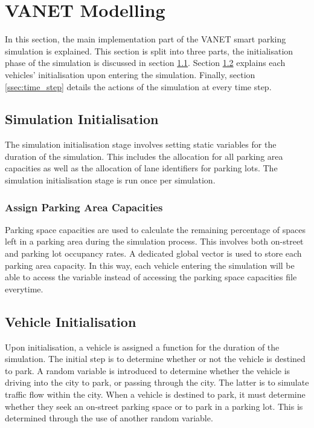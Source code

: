 \section{\ac{VANET} Modelling}
In this section, the main implementation part of the \ac{VANET} smart parking simulation is explained. This section is split into three parts, the initialisation phase of the simulation is discussed in section \ref{ssec:sim_init}. Section \ref{ssec:vehicle_init} explains each vehicles' initialisation upon entering the simulation. Finally, section \ref{ssec:time_step} details the actions of the simulation at every time step.

\subsection{Simulation Initialisation} \label{ssec:sim_init}
The simulation initialisation stage involves setting static variables for the duration of the simulation. This includes the allocation for all parking area capacities as well as the allocation of lane identifiers for parking lots. The simulation initialisation stage is run once per simulation.

\subsubsection{Assign Parking Area Capacities}
Parking space capacities are used to calculate the remaining percentage of spaces left in a parking area during the simulation process. This involves both on-street and parking lot occupancy rates. A dedicated global vector is used to store each parking area capacity. In this way, each vehicle entering the simulation will be able to access the variable instead of accessing the parking space capacities file everytime.

\pagebreak

\subsection{Vehicle Initialisation} \label{ssec:vehicle_init}
Upon initialisation, a vehicle is assigned a function for the duration of the simulation. The initial step is to determine whether or not the vehicle is destined to park. A random variable is introduced to determine whether the vehicle is driving into the city to park, or passing through the city. The latter is to simulate traffic flow within the city. When a vehicle is destined to park, it must determine whether they seek an on-street parking space or to park in a parking lot. This is determined through the use of another random variable.

